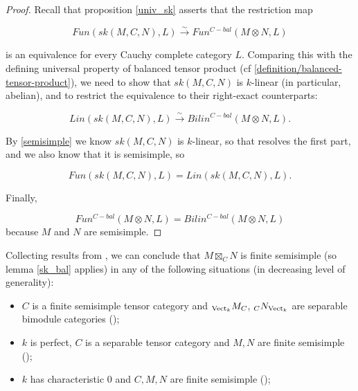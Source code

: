 \begin{proof}
  Recall that proposition \ref{univ_sk} asserts that the restriction map

  \[
   Fun(sk(M,C,N),L) \xrightarrow{\sim} Fun^{C-bal}(M \otimes N,L)
  \]

  is an equivalence for every Cauchy complete category $L$. Comparing this
  with the defining universal property of balanced tensor product
  (cf \ref{definition/balanced-tensor-product}), we need to show that
  $sk(M,C,N)$ is $k$-linear (in particular, abelian), and to restrict the
  equivalence to their right-exact counterparts:

  \[
    Lin(sk(M,C,N),L) \xrightarrow{\sim} Bilin^{C-bal}(M \otimes N, L).
  \]

  By \ref{semisimple} we know $sk(M,C,N)$ is $k$-linear, so that resolves the
  first part, and we also know that it is semisimple, so

  \[
    Fun(sk(M,C,N), L) = Lin(sk(M,C,N), L).
  \]

  Finally,

  \[
    Fun^{C-bal}(M \otimes N, L) = Bilin^{C-bal}(M \otimes N, L)
  \]
  because $M$ and $N$ are semisimple.
\end{proof}

\begin{remark}\label{semisimple_douglas/dualizable-tensor-categories}

  \noindent Collecting results
  from \cite{douglas/dualizable-tensor-categories}, we can conclude that
  $M\boxtimes_C N$ is finite semisimple (so lemma \ref{sk_bal} applies) in any
  of the following situations (in decreasing level of generality):

  \begin{itemize}

    \item $C$ is a finite semisimple tensor category and $_{\operatorname{Vect}_k}M_C$,
    $_{C}N_{\operatorname{Vect}_k}$ are separable bimodule categories (\cite[Proposition
    2.5.3, Theorem 2.5.5]{douglas/dualizable-tensor-categories});

    \item $k$ is perfect, $C$ is a separable tensor category and $M,N$ are
    finite semisimple (\cite[Proposition
    2.5.10]{douglas/dualizable-tensor-categories});

    \item $k$ has characteristic $0$ and $C,M,N$ are finite semisimple
    (\cite[Corollary 2.6.9]{douglas/dualizable-tensor-categories});

  \end{itemize}
\end{remark}

